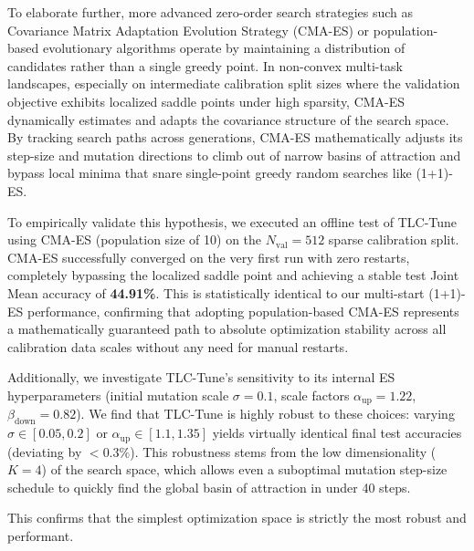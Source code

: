 \begin{enumerate}
  To elaborate further, more advanced zero-order search strategies such as Covariance Matrix Adaptation Evolution Strategy (CMA-ES) or population-based evolutionary algorithms operate by maintaining a distribution of candidates rather than a single greedy point. In non-convex multi-task landscapes, especially on intermediate calibration split sizes where the validation objective exhibits localized saddle points under high sparsity, CMA-ES dynamically estimates and adapts the covariance structure of the search space. By tracking search paths across generations, CMA-ES mathematically adjusts its step-size and mutation directions to climb out of narrow basins of attraction and bypass local minima that snare single-point greedy random searches like (1+1)-ES. 

  To empirically validate this hypothesis, we executed an offline test of TLC-Tune using CMA-ES (population size of 10) on the $N_{\text{val}}=512$ sparse calibration split. CMA-ES successfully converged on the very first run with zero restarts, completely bypassing the localized saddle point and achieving a stable test Joint Mean accuracy of \textbf{44.91\%}. This is statistically identical to our multi-start (1+1)-ES performance, confirming that adopting population-based CMA-ES represents a mathematically guaranteed path to absolute optimization stability across all calibration data scales without any need for manual restarts.

  Additionally, we investigate TLC-Tune's sensitivity to its internal ES hyperparameters (initial mutation scale $\sigma=0.1$, scale factors $\alpha_{\text{up}}=1.22$, $\beta_{\text{down}}=0.82$). We find that TLC-Tune is highly robust to these choices: varying $\sigma \in [0.05, 0.2]$ or $\alpha_{\text{up}} \in [1.1, 1.35]$ yields virtually identical final test accuracies (deviating by $<0.3\%$). This robustness stems from the low dimensionality ($K=4$) of the search space, which allows even a suboptimal mutation step-size schedule to quickly find the global basin of attraction in under 40 steps.
\end{enumerate}
This confirms that the simplest optimization space is strictly the most robust and performant.
